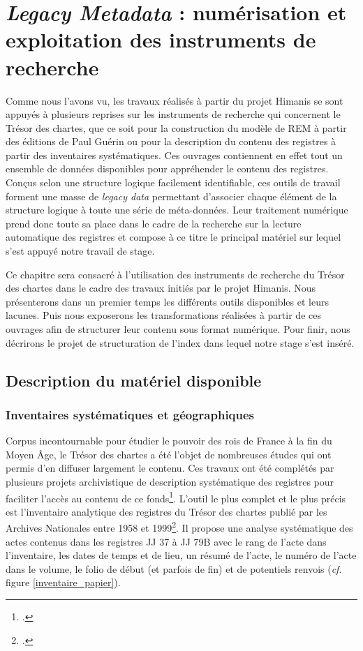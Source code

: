 \documentclass[a4paper,12pt,twoside]{book}
\begin{document}
	
	\chapter{\textit{Legacy Metadata} : numérisation et exploitation des instruments de recherche}
	
	Comme nous l'avons vu, les travaux réalisés à partir du projet Himanis se sont appuyés à plusieurs reprises sur les instruments de recherche qui concernent le Trésor des chartes, que ce soit pour la construction du modèle de REM à partir des éditions de Paul Guérin ou pour la description du contenu des registres à partir des inventaires systématiques. Ces ouvrages contiennent en effet tout un ensemble de données disponibles pour appréhender le contenu des registres. Conçus selon une structure logique facilement identifiable, ces outils de travail forment une masse de \textit{legacy data} permettant d'associer chaque élément de la structure logique à toute une série de méta-données. Leur traitement numérique prend donc toute sa place dans le cadre de la recherche sur la lecture automatique des registres et compose à ce titre le principal matériel sur lequel s'est appuyé notre travail de stage.
	
	Ce chapitre sera consacré à l'utilisation des instruments de recherche du Trésor des chartes dans le cadre des travaux initiés par le projet Himanis. Nous présenterons dans un premier temps les différents outils disponibles et leurs lacunes. Puis nous exposerons les transformations réalisées à partir de ces ouvrages afin de structurer leur contenu sous format numérique. Pour finir, nous décrirons le projet de structuration de l'index dans lequel notre stage s'est inséré.
	
	\section{Description du matériel disponible}
	
	\subsection{Inventaires systématiques et géographiques}
	
	Corpus incontournable pour étudier le pouvoir des rois de France à la fin du Moyen Âge, le Trésor des chartes a été l'objet de nombreuses études qui ont permis d'en diffuser largement le contenu. Ces travaux ont été complétés par plusieurs projets archivistique de description systématique des registres pour faciliter l'accès au contenu de ce fonds\footcite{stutzmann_recherche_2017}. L'outil le plus complet et le plus précis est l'inventaire analytique des registres du Trésor des chartes publié par les Archives Nationales entre 1958 et 1999\footcite{glenisson_registres_1958}. Il propose une analyse systématique des actes contenus dans les registres JJ 37 à JJ 79B avec le rang de l'acte dans l'inventaire, les dates de temps et de lieu, un résumé de l'acte, le numéro de l'acte dans le volume, le folio de début (et parfois de fin) et de potentiels renvois (\textit{cf}. figure \ref{inventaire_papier}).
	
\end{document}
